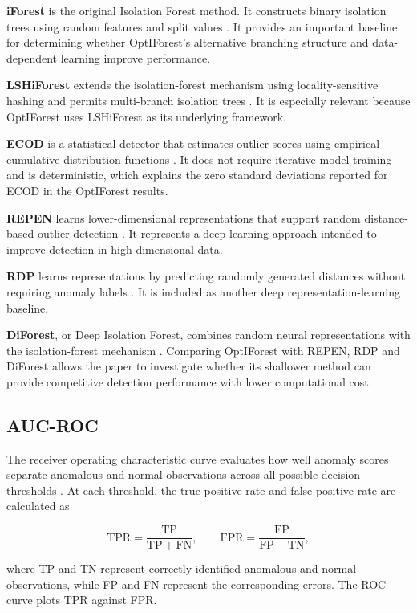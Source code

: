 \documentclass[11pt]{article}
\begin{document}
\textbf{iForest} is the original Isolation Forest method. It constructs
binary isolation trees using random features and split values
\citep{liu2008isolation}. It provides an important baseline for
determining whether OptIForest's alternative branching structure and
data-dependent learning improve performance.

\textbf{LSHiForest} extends the isolation-forest mechanism using
locality-sensitive hashing and permits multi-branch isolation trees
\citep{zhang2017lshiforest}. It is especially relevant because
OptIForest uses LSHiForest as its underlying framework.

\textbf{ECOD} is a statistical detector that estimates outlier scores
using empirical cumulative distribution functions
\citep{li2022ecod}. It does not require iterative model training and is
deterministic, which explains the zero standard deviations reported for
ECOD in the OptIForest results.

\textbf{REPEN} learns lower-dimensional representations that support
random distance-based outlier detection
\citep{pang2018repen}. It represents a deep learning approach intended
to improve detection in high-dimensional data.

\textbf{RDP} learns representations by predicting randomly generated
distances without requiring anomaly labels \citep{wang2021rdp}. It is
included as another deep representation-learning baseline.

\textbf{DiForest}, or Deep Isolation Forest, combines random neural
representations with the isolation-forest mechanism
\citep{xu2022diforest}. Comparing OptIForest with REPEN, RDP and
DiForest allows the paper to investigate whether its shallower method
can provide competitive detection performance with lower computational
cost.

\subsection{AUC-ROC}
The receiver operating characteristic curve evaluates how well anomaly
scores separate anomalous and normal observations across all possible
decision thresholds \citep{fawcett2006roc}. At each threshold, the
true-positive rate and false-positive rate are calculated as

\[
\mathrm{TPR}=\frac{\mathrm{TP}}{\mathrm{TP}+\mathrm{FN}},
\qquad
\mathrm{FPR}=\frac{\mathrm{FP}}{\mathrm{FP}+\mathrm{TN}},
\]

where TP and TN represent correctly identified anomalous and normal
observations, while FP and FN represent the corresponding errors. The
ROC curve plots TPR against FPR.
\end{document}
